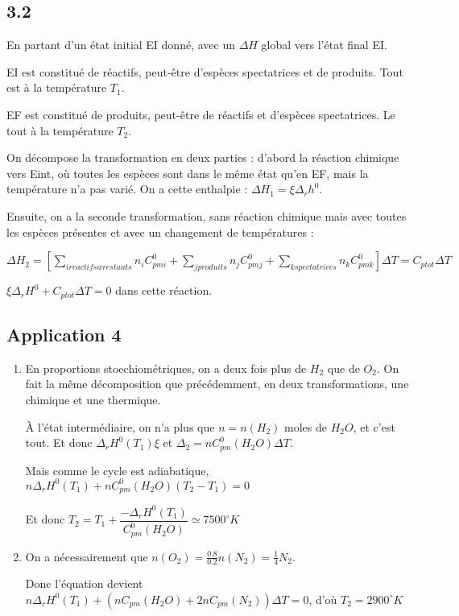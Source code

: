 \documentclass[a4paper,12pt]{book}
\begin{document}
\subsection{3.2}
En partant d'un état initial EI donné, avec un $\Delta H$ global vers l'état final EI.\par EI est constitué de réactifs, peut-être d'espèces spectatrices et de produits. Tout est à la température $T_1$.\par EF est constitué de produits, peut-être de réactifs et d'espèces spectatrices. Le tout à la température $T_2$.
\par On décompose la transformation en deux parties : d'abord la réaction chimique vers Eint, où toutes les espèces sont dans le même état qu'en EF, mais la température n'a pas varié. On a cette enthalpie : $\Delta H_1=\xi\Delta_rh^0$.
\par Ensuite, on a la seconde transformation, sans réaction chimique mais avec toutes les espèces présentes et avec un changement de températures :
\par $\Delta H_2 = \left[\sum\limits_{i reactifsw restants}n_iC_{pmi}^0 +\sum\limits_{jproduits} n_jC_{pmj}^0 + \sum\limits_{k spectatrices} n_kC_{pmk}^0\right]\Delta T = C_{ptot}\Delta T$
\par $\xi\Delta_rH^0 + C_{ptot}\Delta T=0$ dans cette réaction.

\subsection{Application 4}
\begin{enumerate}
\item En proportions stoechiométriques, on a deux fois plus de $H_2$ que de $O_2$. On fait la même décomposition que précédemment, en deux transformations, une chimique et une thermique.
\par À l'état intermédiaire, on n'a plus que $n=n(H_2)$ moles de $H_2O$, et c'est tout. Et donc $\Delta_rH^0(T_1)\xi$ et $\Delta_2=nC_{pm}^0(H_2O)\Delta T$. \par Mais comme le cycle est adiabatique, $n\Delta_rH^0(T_1)+nC_{pm}^0(H_2O)(T_2-T_1)=0$
\par Et donc $T_2 =T_1+\dfrac{-\Delta_rH^0(T_1)}{C_{pm}^0(H_2O)}\simeq 7500^\circ K$
\item On a nécessairement que $n(O_2)=\frac{0.8}{0.2}n(N_2)=\frac{1}{4}N_2$. \par Donc l'équation devient $n\Delta_rH^0(T_1) +\left(nC_{pm}(H_2O) +2nC_{pm}(N_2)\right)\Delta T =0$, d'où $T_2=2900^\circ K$ 
\end{enumerate}
\end{document}
